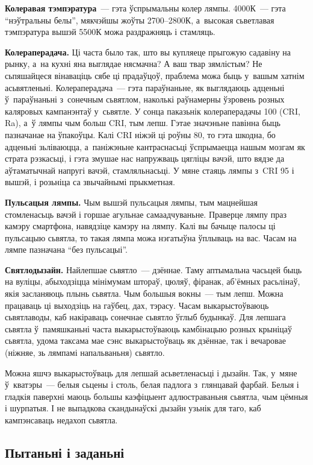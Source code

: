 \textbf{Колеравая тэмпэратура}~--- гэта ўспрымальны колер лямпы. 4000К~--- гэта ``нэўтральны белы'', мякчэйшы жоўты 2700--2800К, а~высокая сьветлавая тэмпэратура вышэй 5500К можа раздражняць і стамляць.

\textbf{Колераперадача.} Ці часта было так, што вы купляеце прыгожую садавіну на рынку, а~на кухні яна выглядае нясмачна? А ваш твар зямлістым? Не сьпяшайцеся вінаваціць сябе ці прадаўцоў, праблема можа быць у~вашым хатнім асьвятленьні. Колераперадача~--- гэта параўнаньне, як выглядаюць адценьні ў~параўнаньні з~сонечным сьвятлом, наколькі раўнамерны ўзровень розных каляровых кампанэнтаў у~сьвятле. У сонца паказьнік колераперадачы 100 (CRI, Ra), а~ў лямпы чым больш CRI, тым лепш. Гэтае значэньне павінна быць пазначанае на ўпакоўцы. Калі CRI ніжэй ці роўны 80, то гэта шкодна, бо адценьні зьліваюцца, а~паніжэньне кантраснасьці ўспрымаецца нашым мозгам як страта рэзкасьці, і гэта змушае нас напружваць цягліцы вачэй, што вядзе да аўтаматычнай напругі вачэй, стамляльнасьці. У мяне стаяць лямпы з~CRI 95 і вышэй, і розьніца са звычайнымі прыкметная.

\textbf{Пульсацыя лямпы.} Чым вышэй пульсацыя лямпы, тым мацнейшая стомленасьць вачэй і горшае агульнае самаадчуваньне. Праверце лямпу праз камэру смартфона, навядзіце камэру на лямпу. Калі вы бачыце палосы ці пульсацыю сьвятла, то такая лямпа можа нэгатыўна ўплываць на вас. Часам на лямпе пазначана ``без пульсацыі''.

\textbf{Святлодызайн.} Найлепшае сьвятло~--- дзённае. Таму аптымальна часьцей быць на вуліцы, абыходзіцца мінімумам штораў, цюляў, фіранак, аб'ёмных расьлінаў, якія засланяюць плынь сьвятла. Чым большыя вокны~--- тым лепш. Можна працаваць ці выходзіць на гаўбец, дах, тэрасу. Часам выкарыстоўваюць сьвятлаводы, каб накіраваць сонечнае сьвятло ўглыб будынкаў. Для лепшага сьвятла ў~памяшканьні часта выкарыстоўваюць камбінацыю розных крыніцаў сьвятла, удома таксама мае сэнс выкарыстоўваць як дзённае, так і вечаровае (ніжняе, зь лямпамі напальваньня) сьвятло.

Можна яшчэ выкарыстоўваць для лепшай асьветленасьці і дызайн. Так, у~мяне ў~кватэры~--- белыя сьцены і столь, белая падлога з~глянцавай фарбай. Белыя і гладкія паверхні маюць большы каэфіцыент адлюстраваньня сьвятла, чым цёмныя і шурпатыя. І не выпадкова скандынаўскі дызайн узьнік для таго, каб кампэнсаваць недахоп сьвятла.

\subsection*{Пытаньні і заданьні}

